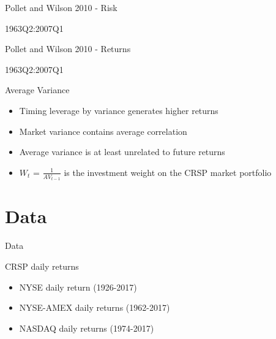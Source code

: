 \documentclass{beamer}
\begin{document}
\begin{frame}{Pollet and Wilson 2010 - Risk}
		\vspace{-12pt}
		\begin{table}
			\caption{1963Q2:2007Q1}
			\vspace{-18pt}
			\begin{adjustbox}{width=\textwidth,height=3cm}
				
			\end{adjustbox}
		\end{table}
\end{frame}

\begin{frame}{Pollet and Wilson 2010 - Returns}
		\vspace{-12pt}
		\begin{table}
			\caption{1963Q2:2007Q1}
			\vspace{-18pt}
			\begin{adjustbox}{width=\textwidth,height=3cm}
				
			\end{adjustbox}
		\end{table}
\end{frame}

\begin{frame}{Average Variance}
	\begin{itemize}
		\item Timing leverage by variance generates higher returns
		\item Market variance contains average correlation
		\item Average variance is at least unrelated to future returns
		\item $W_{t}$ = $\frac{1}{AV_{t-1}}$ is the investment weight on the CRSP market portfolio
	\end{itemize}
	\begin{adjustbox}{width=\textwidth}
		
	\end{adjustbox}
\end{frame}

\section{Data}

\begin{frame}{Data}
	\begin{block}{CRSP daily returns}
		\begin{itemize}
			\item NYSE daily return (1926-2017)
			\item NYSE-AMEX daily returns (1962-2017)
			\item NASDAQ daily returns (1974-2017)
		\end{itemize}
	\end{block}
\end{frame}
\end{document}
